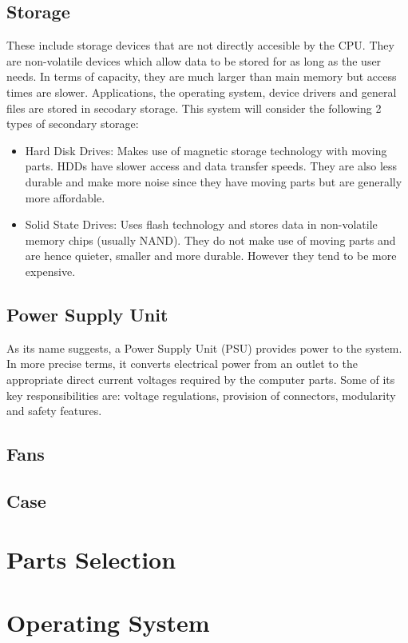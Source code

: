 \documentclass[12pt, a4paper]{article}
\begin{document}
\subsection{Storage}
These include storage devices that are not directly accesible by the CPU.
They are non-volatile devices which allow data to be stored for as long
as the user needs. In terms of capacity, they are much larger than main
memory but access times are slower. Applications, the operating system,
device drivers and general files are stored in secodary storage. This
system will consider the following 2 types of secondary storage:
\begin{itemize}
  \item Hard Disk Drives: Makes use of magnetic storage technology with 
    moving parts. HDDs have slower access and data transfer speeds. They
    are also less durable and make more noise since they have 
    moving parts but are generally more affordable. 
  \item Solid State Drives: Uses flash technology and stores data in 
    non-volatile memory chips (usually NAND). They do not make use
    of moving parts and are hence quieter, smaller and more durable. 
    However they tend to be more expensive.
\end{itemize}

\subsection{Power Supply Unit}
As its name suggests, a Power Supply Unit (PSU) provides power to the 
system. In more precise terms, it converts electrical power from an outlet
to the appropriate direct current voltages required by the computer parts.
Some of its key responsibilities are: voltage regulations, provision
of connectors, modularity and safety features.

\subsection{Fans}

\subsection{Case}



\section{Parts Selection}



\section{Operating System}

\end{document}

